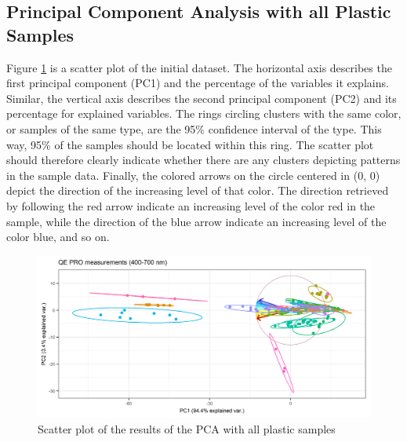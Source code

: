 \subsection{Principal Component Analysis with all Plastic Samples}\label{sec:pcafull}
Figure \ref{fig:PCA_plastics_only_full_scat} is a scatter plot of the initial dataset. The horizontal axis describes the first principal component (PC1) and the percentage of the variables it explains. Similar, the vertical axis describes the second principal component (PC2) and its percentage for explained variables. The rings circling clusters with the same color, or samples of the same type, are the 95\% confidence interval of the type. This way, 95\% of the samples should be located within this ring. The scatter plot should therefore clearly indicate whether there are any clusters depicting patterns in the sample data. Finally, the colored arrows on the circle centered in (0, 0) depict the direction of the increasing level of that color. The direction retrieved by following the red arrow indicate an increasing level of the color red in the sample, while the direction of the blue arrow indicate an increasing level of the color blue, and so on.

\begin{figure}[H]
    \centering
    \includegraphics[width=1\textwidth]{Images/results/PCA_plastics_full_only_scat.png}
    \caption{Scatter plot of the results of the PCA with all plastic samples}
    \label{fig:PCA_plastics_only_full_scat}
\end{figure}

